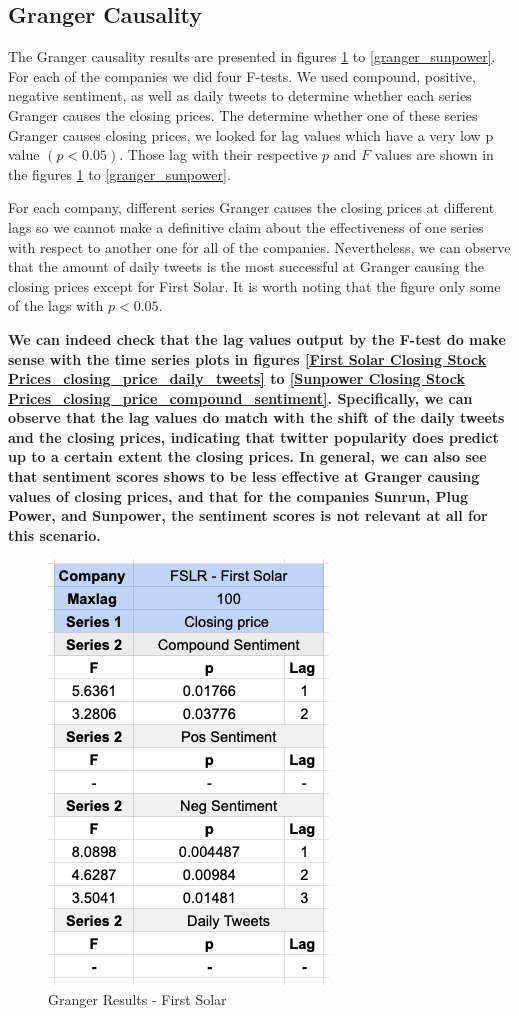 \documentclass[sigconf, nonacm]{acmart}
\begin{document}
\subsection{Granger Causality} 
The Granger causality results are presented in figures \ref{granger_first_solar} to \ref{granger_sunpower}. For each of the companies we did four F-tests. We used compound, positive, negative sentiment, as well as daily tweets to determine whether each series Granger causes the closing prices. The determine whether one of these series Granger causes closing prices, we looked for lag values which have a very low p value $(p < 0.05)$. Those lag with their respective $p$ and $F$ values are shown in the figures  \ref{granger_first_solar} to \ref{granger_sunpower}. \newline

For each company, different series Granger causes the closing prices at different lags so we cannot make a definitive claim about the effectiveness of one series with respect to another one for all of the companies. Nevertheless, we can observe that the amount of daily tweets is the most successful at Granger causing the closing prices except for First Solar.  It is worth noting that the figure only some of the lags with $p < 0.05$. \newline

\textbf{We can indeed check that the lag values output by the F-test do make sense with the time series plots in figures \ref{First Solar Closing Stock Prices_closing_price_daily_tweets} to \ref{Sunpower Closing Stock Prices_closing_price_compound_sentiment}. Specifically, we can observe that the lag values do match with the shift of the daily tweets and the closing prices, indicating that twitter popularity does predict up to a certain extent the closing prices. In general, we can also see that sentiment scores shows to be less effective at Granger causing values of closing prices, and that for the companies Sunrun, Plug Power, and Sunpower, the sentiment scores is not relevant at all for this scenario.}

\begin{figure}[H]
  \centering
  \includegraphics[width=0.4\linewidth]{granger_results/granger_first_solar.png}
  \caption{Granger Results - First Solar}
  \label{granger_first_solar}
\end{figure}
\end{document}
